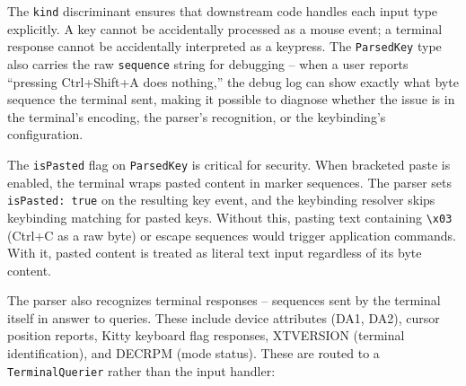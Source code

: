 \documentclass[
  english,
  11pt,
  letterpaper,
]{book}
\begin{document}
The \texttt{kind} discriminant ensures that downstream code handles each
input type explicitly. A key cannot be accidentally processed as a mouse
event; a terminal response cannot be accidentally interpreted as a
keypress. The \texttt{ParsedKey} type also carries the raw
\texttt{sequence} string for debugging -- when a user reports ``pressing
Ctrl+Shift+A does nothing,'' the debug log can show exactly what byte
sequence the terminal sent, making it possible to diagnose whether the
issue is in the terminal's encoding, the parser's recognition, or the
keybinding's configuration.

The \texttt{isPasted} flag on \texttt{ParsedKey} is critical for
security. When bracketed paste is enabled, the terminal wraps pasted
content in marker sequences. The parser sets \texttt{isPasted:\ true} on
the resulting key event, and the keybinding resolver skips keybinding
matching for pasted keys. Without this, pasting text containing
\texttt{\textbackslash{}x03} (Ctrl+C as a raw byte) or escape sequences
would trigger application commands. With it, pasted content is treated
as literal text input regardless of its byte content.

The parser also recognizes terminal responses -- sequences sent by the
terminal itself in answer to queries. These include device attributes
(DA1, DA2), cursor position reports, Kitty keyboard flag responses,
XTVERSION (terminal identification), and DECRPM (mode status). These are
routed to a \texttt{TerminalQuerier} rather than the input handler:
\end{document}
